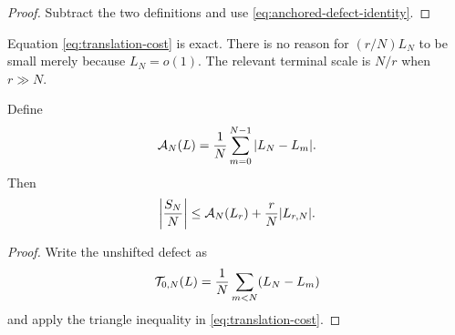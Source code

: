 \begin{proof}
Subtract the two definitions and use
\cref{eq:anchored-defect-identity}.
\end{proof}

\begin{remark}
\label{rem:anchor-main-term}
Equation \eqref{eq:translation-cost} is exact.  There is no reason for
\((r/N)L_N\) to be small merely because \(L_N=o(1)\).  The relevant
terminal scale is \(N/r\) when \(r\gg N\).
\end{remark}

\begin{proposition}
\label{prop:absolute-anchored}
Define
\[
 \mathcal A_N(L)=\frac1N\sum_{m=0}^{N-1}|L_N-L_m|.
\]
Then
\begin{equation}
 \left|\frac{S_N}{N}\right|
 \le \mathcal A_N(L_r)+\frac rN|L_{r,N}|.
\label{eq:absolute-anchored}
\end{equation}
\end{proposition}

\begin{proof}
Write the unshifted defect as
\[
 \mathcal T_{0,N}(L)=\frac1N\sum_{m<N}(L_N-L_m)
\]
and apply the triangle inequality in
\eqref{eq:translation-cost}.
\end{proof}
